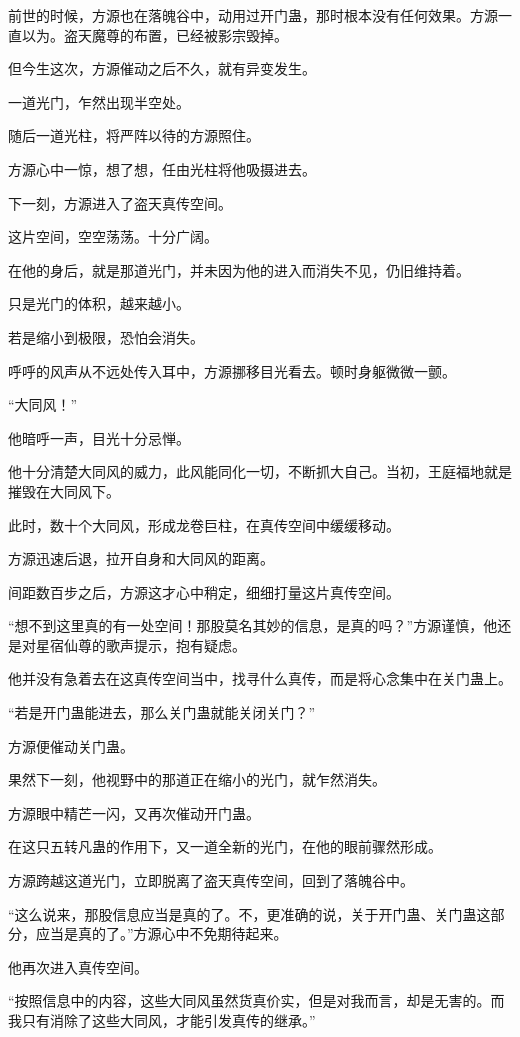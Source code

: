 \begin{this_body}
前世的时候，方源也在落魄谷中，动用过开门蛊，那时根本没有任何效果。方源一直以为。盗天魔尊的布置，已经被影宗毁掉。

但今生这次，方源催动之后不久，就有异变发生。

一道光门，乍然出现半空处。

随后一道光柱，将严阵以待的方源照住。

方源心中一惊，想了想，任由光柱将他吸摄进去。

下一刻，方源进入了盗天真传空间。

这片空间，空空荡荡。十分广阔。

在他的身后，就是那道光门，并未因为他的进入而消失不见，仍旧维持着。

只是光门的体积，越来越小。

若是缩小到极限，恐怕会消失。

呼呼的风声从不远处传入耳中，方源挪移目光看去。顿时身躯微微一颤。

“大同风！”

他暗呼一声，目光十分忌惮。

他十分清楚大同风的威力，此风能同化一切，不断抓大自己。当初，王庭福地就是摧毁在大同风下。

此时，数十个大同风，形成龙卷巨柱，在真传空间中缓缓移动。

方源迅速后退，拉开自身和大同风的距离。

间距数百步之后，方源这才心中稍定，细细打量这片真传空间。

“想不到这里真的有一处空间！那股莫名其妙的信息，是真的吗？”方源谨慎，他还是对星宿仙尊的歌声提示，抱有疑虑。

他并没有急着去在这真传空间当中，找寻什么真传，而是将心念集中在关门蛊上。

“若是开门蛊能进去，那么关门蛊就能关闭关门？”

方源便催动关门蛊。

果然下一刻，他视野中的那道正在缩小的光门，就乍然消失。

方源眼中精芒一闪，又再次催动开门蛊。

在这只五转凡蛊的作用下，又一道全新的光门，在他的眼前骤然形成。

方源跨越这道光门，立即脱离了盗天真传空间，回到了落魄谷中。

“这么说来，那股信息应当是真的了。不，更准确的说，关于开门蛊、关门蛊这部分，应当是真的了。”方源心中不免期待起来。

他再次进入真传空间。

“按照信息中的内容，这些大同风虽然货真价实，但是对我而言，却是无害的。而我只有消除了这些大同风，才能引发真传的继承。”


\end{this_body}
